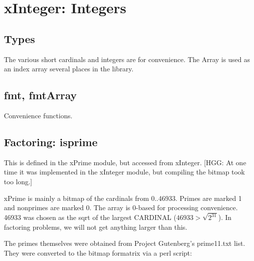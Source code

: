 \section{xInteger: Integers}

\subsection*{Types}
The various short cardinals and integers are for convenience.  The
Array is used as an index array several places in the library.

\subsection*{fmt, fmtArray}
Convenience functions.

\subsection*{Factoring: isprime}
This is defined in the xPrime module, but accessed from xInteger.  [HGG: At one
time it was implemented in the xInteger module, but compiling the
bitmap took too long.]

xPrime is mainly a bitmap of the cardinals from
0..46933.  Primes are marked 1 and nonprimes are marked 0.  The array is
0-based for processing convenience.  46933 was chosen as the sqrt of
the largest CARDINAL ($46933 > \sqrt{2^{31}}$).  In factoring problems,
we will not get anything larger than this.

The primes themselves were obtained from Project Gutenberg's prime11.txt
list.  They were converted to the bitmap formatrix via a perl script:

